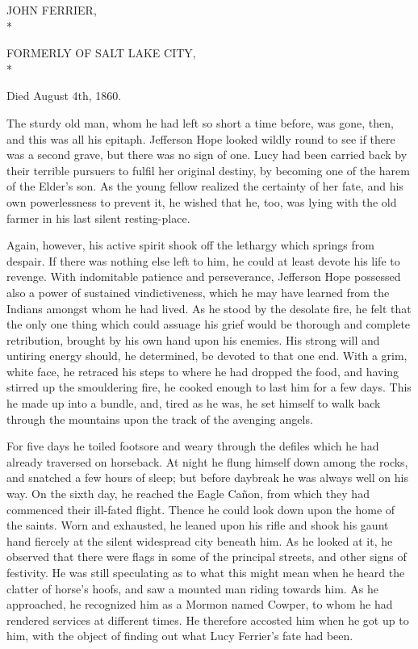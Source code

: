 \documentclass[12pt,english]{book}
\begin{document}
\begin{center} \sc

JOHN FERRIER, \\*

\small FORMERLY OF SALT LAKE CITY, \\*

Died August 4th, 1860.

\end{center}

The sturdy old man, whom he had left so short a time before, was gone,
then, and this was all his epitaph. Jefferson Hope looked wildly round
to see if there was a second grave, but there was no sign of one.
Lucy had been carried back by their terrible pursuers to fulfil her
original destiny, by becoming one of the harem of the Elder's son.
As the young fellow realized the certainty of her fate, and his own
powerlessness to prevent it, he wished that he, too, was lying with
the old farmer in his last silent resting-place.

Again, however, his active spirit shook off the lethargy which springs
from despair. If there was nothing else left to him, he could at least
devote his life to revenge. With indomitable patience and perseverance,
Jefferson Hope possessed also a power of sustained vindictiveness,
which he may have learned from the Indians amongst whom he had lived.
As he stood by the desolate fire, he felt that the only one thing
which could assuage his grief would be thorough and complete retribution,
brought by his own hand upon his enemies. His strong will and untiring
energy should, he determined, be devoted to that one end. With a grim,
white face, he retraced his steps to where he had dropped the food,
and having stirred up the smouldering fire, he cooked enough to last
him for a few days. This he made up into a bundle, and, tired as he
was, he set himself to walk back through the mountains upon the track
of the avenging angels.

For five days he toiled footsore and weary through the defiles which
he had already traversed on horseback. At night he flung himself down
among the rocks, and snatched a few hours of sleep; but before daybreak
he was always well on his way. On the sixth day, he reached the Eagle
Ca\~{n}on, from which they had commenced their ill-fated flight. Thence
he could look down upon the home of the saints. Worn and exhausted,
he leaned upon his rifle and shook his gaunt hand fiercely at the
silent widespread city beneath him. As he looked at it, he observed
that there were flags in some of the principal streets, and other
signs of festivity. He was still speculating as to what this might
mean when he heard the clatter of horse's hoofs, and saw a mounted
man riding towards him. As he approached, he recognized him as a Mormon
named Cowper, to whom he had rendered services at different times.
He therefore accosted him when he got up to him, with the object of
finding out what Lucy Ferrier's fate had been.
\end{document}
